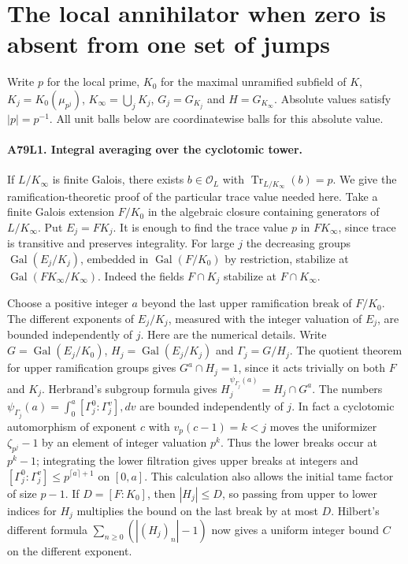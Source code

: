 \section{The local annihilator when zero is absent from one set of jumps}

Write $p$ for the local prime, $K_0$ for the maximal unramified subfield
of $K$, $K_j=K_0(\mu_{p^j})$, $K_\infty=\bigcup_j K_j$,
$G_j=G_{K_j}$ and $H=G_{K_\infty}$. Absolute values satisfy $|p|=p^{-1}$.
All unit balls below are coordinatewise balls for this absolute value.

\paragraph{A79L1. Integral averaging over the cyclotomic tower.}
If $L/K_\infty$ is finite Galois, there exists $b\in\mathcal O_L$
with $\operatorname{Tr}_{L/K_\infty}(b)=p$.
We give the ramification-theoretic proof of the particular trace value
needed here. Take a finite Galois extension $F/K_0$ in the algebraic
closure containing generators of $L/K_\infty$. Put $E_j=FK_j$. It is
enough to find the trace value $p$ in $FK_\infty$, since trace is
transitive and preserves integrality. For large $j$ the decreasing
groups $\operatorname{Gal}(E_j/K_j)$, embedded in
$\operatorname{Gal}(F/K_0)$ by restriction, stabilize at
$\operatorname{Gal}(FK_\infty/K_\infty)$. Indeed the fields
$F\cap K_j$ stabilize at $F\cap K_\infty$.

Choose a positive integer $a$ beyond the last upper ramification break
of $F/K_0$. The different exponents of $E_j/K_j$, measured with
the integer valuation of $E_j$, are bounded independently of $j$.
Here are the numerical details. Write $G=\operatorname{Gal}(E_j/K_0)$,
$H_j=\operatorname{Gal}(E_j/K_j)$ and $\Gamma_j=G/H_j$.
The quotient theorem for upper ramification groups gives
$G^a\cap H_j=1$, since it acts trivially on both $F$ and $K_j$.
Herbrand's subgroup formula gives
$H_j^{\psi_{\Gamma_j}(a)}=H_j\cap G^a$. The numbers
$\psi_{\Gamma_j}(a)=\int_0^a[\Gamma_j^0:\Gamma_j^v],dv$
are bounded independently of $j$. In fact a cyclotomic automorphism
of exponent $c$ with $v_p(c-1)=k<j$ moves the uniformizer
$\zeta_{p^j}-1$ by an element of integer valuation $p^k$.
Thus the lower breaks occur at $p^k-1$; integrating the lower
filtration gives upper breaks at integers and
$[\Gamma_j^0:\Gamma_j^v]\le p^{\lceil a\rceil+1}$ on $[0,a]$.
This calculation also allows the initial tame factor of size $p-1$.
If $D=[F:K_0]$, then $|H_j|\le D$, so passing from upper to lower
indices for $H_j$ multiplies the bound on the last break by at most
$D$. Hilbert's different formula $\sum_{n\ge0}(|(H_j)_n|-1)$
now gives a uniform integer bound $C$ on the different exponent.

